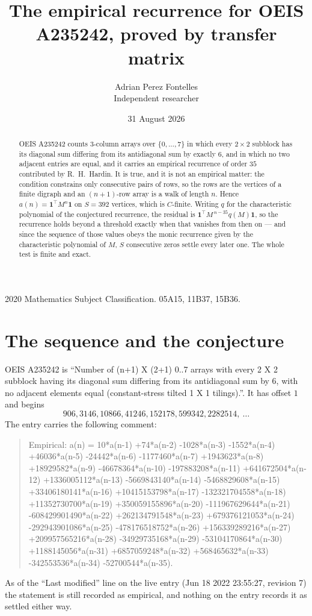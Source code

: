 \documentclass[11pt,a4paper]{article}
\title{The empirical recurrence for OEIS A235242, proved by transfer matrix}
\author{Adrian Perez Fontelles\\ \small Independent researcher}
\date{31 August 2026}
\theoremstyle{plain}
\theoremstyle{definition}
\begin{document}
\maketitle

\begin{abstract}
OEIS A235242 counts $3$-column arrays over $\{0,\dots,7\}$ in which every
$2\times2$ subblock has its diagonal sum differing from its antidiagonal sum by
exactly $6$, and in which no two adjacent entries are equal, and it
carries an empirical recurrence of order $35$ contributed by R.~H.~Hardin. It is true,
and it is not an empirical matter: the condition constrains only consecutive pairs of rows,
so the rows are the vertices of a finite digraph and an $(n+1)$-row array is a walk of
length $n$. Hence $a(n)=\mathbf{1}^{\!\top}M^{n}\mathbf{1}$ on $S=392$ vertices, which
is $C$-finite. Writing $q$ for the characteristic polynomial of the conjectured recurrence,
the residual is $\mathbf{1}^{\!\top}M^{\,n-35}q(M)\mathbf{1}$, so the recurrence
holds beyond a threshold exactly when that vanishes from then on --- and since the sequence
of those values obeys the monic recurrence given by the characteristic polynomial of $M$,
$S$ consecutive zeros settle every later one. The whole test is finite and exact.
\end{abstract}

\noindent\small 2020 Mathematics Subject Classification. 05A15, 11B37, 15B36.\normalsize

\section{The sequence and the conjecture}

OEIS A235242 is ``Number of (n+1) X (2+1) 0..7 arrays with every 2 X 2 subblock having its diagonal sum differing from its antidiagonal sum by 6, with no adjacent elements equal (constant-stress tilted 1 X 1 tilings).''. It has offset
$1$ and begins
\[
906, 3146, 10866, 41246, 152178, 599342, 2282514,\ \dots
\]
The entry carries the following comment:
\begin{quote}\small
Empirical: a(n) = 10*a(n-1) +74*a(n-2) -1028*a(n-3) -1552*a(n-4) +46036*a(n-5) -24442*a(n-6) -1177460*a(n-7) +1943623*a(n-8) +18929582*a(n-9) -46678364*a(n-10) -197883208*a(n-11) +641672504*a(n-12) +1336005112*a(n-13) -5669843140*a(n-14) -5468829608*a(n-15) +33406180141*a(n-16) +10415153798*a(n-17) -132321704558*a(n-18) +11352730700*a(n-19) +350059155896*a(n-20) -111967629644*a(n-21) -608429901490*a(n-22) +262134791548*a(n-23) +679376121053*a(n-24) -292943901086*a(n-25) -478176518752*a(n-26) +156339289216*a(n-27) +209957565216*a(n-28) -34929735168*a(n-29) -53104170864*a(n-30) +1188145056*a(n-31) +6857059248*a(n-32) +568465632*a(n-33) -342553536*a(n-34) -52700544*a(n-35).
\end{quote}
As of the ``Last modified'' line on the live entry (Jun 18 2022 23:55:27, revision 7) the statement is
still recorded as empirical, and nothing on the entry records it as settled either way.
\end{document}
